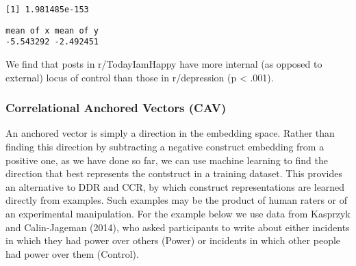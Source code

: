 \documentclass[
  man,
  floatsintext,
  longtable,
  nolmodern,
  notxfonts,
  notimes,
  colorlinks=true,linkcolor=blue,citecolor=blue,urlcolor=blue]{apa7}
\newenvironment{Shaded}{\begin{snugshade}}{\end{snugshade}}
\newcommand{\AttributeTok}[1]{\textcolor[rgb]{0.40,0.45,0.13}{#1}}
\newcommand{\CommentTok}[1]{\textcolor[rgb]{0.37,0.37,0.37}{#1}}
\newcommand{\FunctionTok}[1]{\textcolor[rgb]{0.28,0.35,0.67}{#1}}
\newcommand{\NormalTok}[1]{\textcolor[rgb]{0.00,0.23,0.31}{#1}}
\newcommand{\OtherTok}[1]{\textcolor[rgb]{0.00,0.23,0.31}{#1}}
\newcommand{\SpecialCharTok}[1]{\textcolor[rgb]{0.37,0.37,0.37}{#1}}
\newcommand{\StringTok}[1]{\textcolor[rgb]{0.13,0.47,0.30}{#1}}
\begin{document}
\begin{Shaded}
\end{Shaded}

\begin{verbatim}
[1] 1.981485e-153
\end{verbatim}

\begin{Shaded}
\end{Shaded}

\begin{verbatim}
mean of x mean of y 
-5.543292 -2.492451 
\end{verbatim}

We find that posts in r/TodayIamHappy have more internal (as opposed to
external) locus of control than those in r/depression (p \textless{}
.001).

\subsubsection{Correlational Anchored Vectors
(CAV)}\label{correlational-anchored-vectors-cav}

An anchored vector is simply a direction in the embedding space. Rather
than finding this direction by subtracting a negative construct
embedding from a positive one, as we have done so far, we can use
machine learning to find the direction that best represents the
contstruct in a training dataset. This provides an alternative to DDR
and CCR, by which construct representations are learned directly from
examples. Such examples may be the product of human raters or of an
experimental manipulation. For the example below we use data from
Kasprzyk and Calin-Jageman (2014), who asked participants to write about
either incidents in which they had power over others (Power) or
incidents in which other people had power over them (Control).
\end{document}
